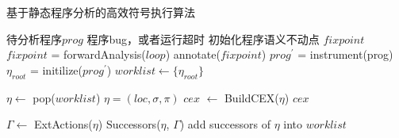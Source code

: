 
\begin{algorithm}[h]
\renewcommand{\algorithmicrequire}{\textbf{Input:}}
\renewcommand{\algorithmicensure}{\textbf{Output:}}
\caption{基于静态程序分析的高效符号执行算法}
\label{algo-absint-symexe}
\begin{algorithmic}[1]
\REQUIRE 待分析程序$prog$
\ENSURE 程序bug，或者运行超时
\STATE 初始化程序语义不动点 $fixpoint$
	\STATE $fixpoint$ = forwardAnalysis($loop$)
	\STATE annotate($fixpoint$)
\ENDFOR
\STATE $prog^{'}$ = instrument(prog)
\STATE $\eta_{root}$ = initilize($prog^{'}$)
\STATE $worklist \gets \{ \eta_{root}\}$

{}
	\STATE $\eta \gets $ pop($worklist$)
		\STATE $\eta = (loc, \sigma, \pi)$
			\STATE $\mathit{cex}$ $\gets$ BuildCEX($\eta$)
			\RETURN $\mathit{cex}$
		\ENDIF
	
	\ELSE
		\STATE $\Gamma \gets $ ExtActions($\eta$)
		\STATE Successors($\eta$, $\Gamma$)
		\STATE add successors of $\eta$ into $worklist$
	\ENDIF
\ENDWHILE
\end{algorithmic}
\end{algorithm}


